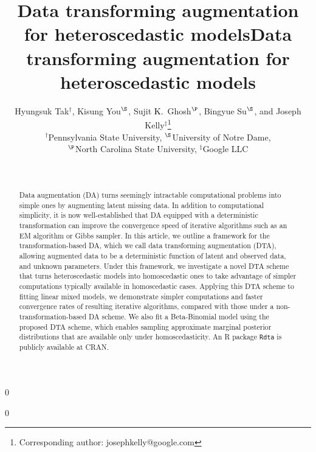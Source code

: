 \documentclass[12pt]{article}
\newcommand{\blind}{0}
\begin{document}
\date{}
%

\newcommand{\ssection}[1]{\section[#1]{\centering #1}}

\def\spacingset#1{\renewcommand{\baselinestretch}%
{#1}\small\normalsize} \spacingset{1}


\blind
{
  \title{\bf  Data transforming augmentation for heteroscedastic models}%
  \author{Hyungsuk Tak$^{\dag}$, Kisung You$^{\S}$, Sujit \textcolor{black}{K.}~Ghosh$^{\P}$, Bingyue Su$^{\S}$, and Joseph Kelly$^{\ddag}$\thanks{Corresponding author: josephkelly@google.com} \vspace{.4cm}\\
     $^{\dag}$Pennsylvania State University, $^{\S}$University of Notre Dame,\\ $^{\P}$North Carolina State University, $^{\ddag}$Google LLC}
  \maketitle
} \fi

\blind
{
   \title{\bf Data transforming augmentation for heteroscedastic models}%
   \author{~}
   \maketitle
} \fi


\begin{abstract}
\noindent Data augmentation (DA) turns seemingly intractable computational problems into simple ones by augmenting latent missing data. In addition to  computational simplicity, it is now well-established that DA equipped with a deterministic transformation can improve the convergence speed of iterative algorithms such as an EM algorithm or Gibbs sampler. In this article, we outline a  framework for the transformation-based DA, which we call data transforming augmentation (DTA), allowing augmented data to be a deterministic function of latent and observed data, and unknown parameters. Under this framework, we  investigate a novel DTA scheme that turns heteroscedastic models into  homoscedastic ones to take advantage of simpler computations typically available in homoscedastic cases. Applying this DTA scheme to fitting linear mixed models, we demonstrate simpler computations and faster convergence rates of resulting iterative algorithms, compared with those  under a non-transformation-based DA scheme. We also fit a Beta-Binomial model using the proposed DTA scheme, which enables sampling approximate marginal posterior distributions  that are available only under homoscedasticity. An R package \texttt{Rdta} is publicly available at CRAN.
\end{abstract}
\end{document}
